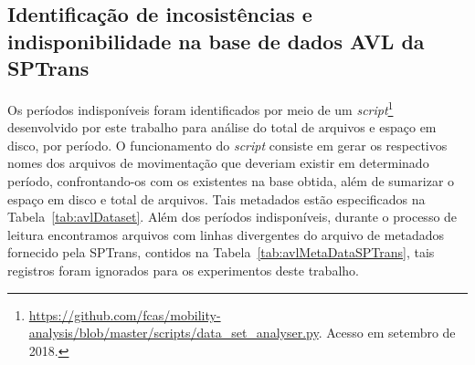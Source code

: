 \documentclass[
	12pt,				%
	oneside,			%
	a4paper,			%
	english,			%
	brazil				%
	]{abntex2ppgsi}
\begin{document}
{{{\subsection{Identificação de incosistências e indisponibilidade na base de dados AVL da  SPTrans}

Os períodos indisponíveis foram identificados por meio de um \textit{script}\footnote{\url{https://github.com/fcas/mobility-analysis/blob/master/scripts/data_set_analyser.py}. Acesso em setembro de 2018.} desenvolvido por este trabalho para análise do total de arquivos e espaço em disco, por período. O funcionamento do \textit{script} consiste em gerar os respectivos nomes dos arquivos de movimentação que deveriam existir em determinado período, confrontando-os com os existentes na base obtida, além de sumarizar o espaço em disco e total de arquivos. Tais metadados estão especificados na Tabela~\ref{tab:avlDataset}. Além dos períodos indisponíveis, durante o processo de leitura encontramos arquivos com linhas divergentes do arquivo de metadados fornecido pela SPTrans, contidos na Tabela~\ref{tab:avlMetaDataSPTrans}, tais registros foram ignorados para os experimentos deste trabalho.

}}}
\end{document}
